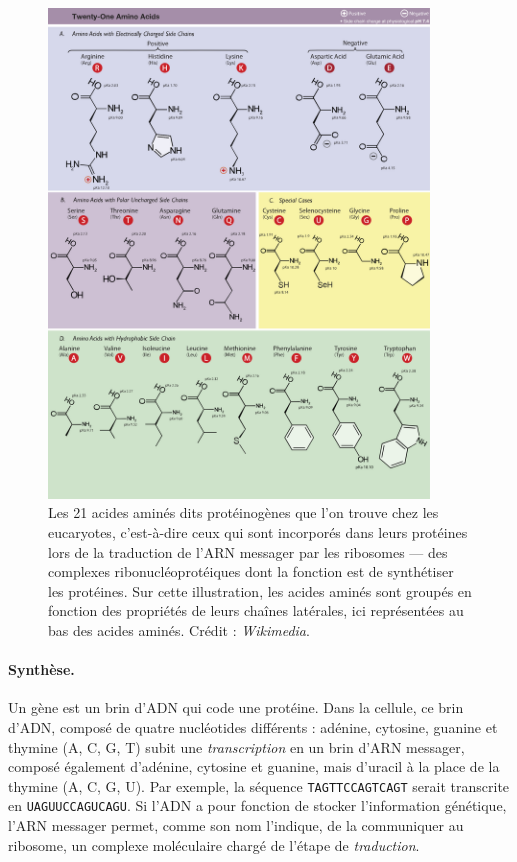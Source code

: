 	\begin{figure}[htb]
		\centering
		\includegraphics[width=0.9\textwidth]{figures/ch1/aminoAcids}
		\caption[Ensemble des acides aminés]{Les 21 acides aminés dits protéinogènes que l'on trouve chez les eucaryotes, c'est-à-dire ceux qui sont incorporés dans leurs protéines lors de la traduction de l'ARN messager par les ribosomes --- des complexes ribonucléoprotéiques dont la fonction est de synthétiser les protéines. Sur cette illustration, les acides aminés sont groupés en fonction des propriétés de leurs chaînes latérales, ici représentées \og au bas \fg{} des acides aminés. Crédit : \emph{Wikimedia}.}
		\label{fig:aminoAcids}
	\end{figure}
	
	\paragraph{Synthèse.}
	Un gène est un brin d'ADN qui \og code \fg{}  une protéine. Dans la cellule, ce brin d'ADN, composé de quatre nucléotides différents : adénine, cytosine, guanine et thymine (A, C, G, T) subit une \emph{transcription} en un brin d'ARN messager, composé également d'adénine, cytosine et guanine, mais d'uracil à la place de la thymine (A, C, G, U). Par exemple, la séquence \texttt{TAGTTCCAGTCAGT} serait transcrite en \texttt{UAGUUCCAGUCAGU}. Si l'ADN a pour fonction de stocker l'information génétique, l'ARN messager permet, comme son nom l'indique, de la communiquer au ribosome, un complexe moléculaire chargé de l'étape de \emph{traduction}.
	
